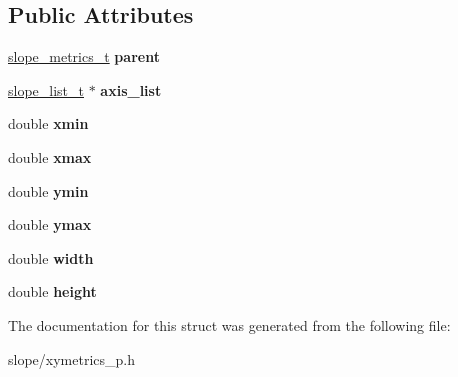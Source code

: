 \subsection*{Public Attributes}
\begin{DoxyCompactItemize}
\item 
\hypertarget{struct__slope__xymetrics_aec0f7546c89f84b770fe7967602f8b5f}{\hyperlink{group__Metrics_gab80787ee8ae8dc449e770249fe0e3c35}{slope\+\_\+metrics\+\_\+t} {\bfseries parent}}\label{struct__slope__xymetrics_aec0f7546c89f84b770fe7967602f8b5f}

\item 
\hypertarget{struct__slope__xymetrics_a0872d22ecbf7129241bf947cfef15769}{\hyperlink{group__List_ga88326d377deca937191acac6784bff0e}{slope\+\_\+list\+\_\+t} $\ast$ {\bfseries axis\+\_\+list}}\label{struct__slope__xymetrics_a0872d22ecbf7129241bf947cfef15769}

\item 
\hypertarget{struct__slope__xymetrics_ad1d3347be073c3d5e54dcc4fcf8be3f0}{double {\bfseries xmin}}\label{struct__slope__xymetrics_ad1d3347be073c3d5e54dcc4fcf8be3f0}

\item 
\hypertarget{struct__slope__xymetrics_a1b5bc871445b58a36fdbd8fda316da64}{double {\bfseries xmax}}\label{struct__slope__xymetrics_a1b5bc871445b58a36fdbd8fda316da64}

\item 
\hypertarget{struct__slope__xymetrics_a0185807d2c62875950fb1001005ee0b3}{double {\bfseries ymin}}\label{struct__slope__xymetrics_a0185807d2c62875950fb1001005ee0b3}

\item 
\hypertarget{struct__slope__xymetrics_a68d0668dd3b423c8fb44fe943cfaaed6}{double {\bfseries ymax}}\label{struct__slope__xymetrics_a68d0668dd3b423c8fb44fe943cfaaed6}

\item 
\hypertarget{struct__slope__xymetrics_adecdb95c1bc9394ea4332c2182539153}{double {\bfseries width}}\label{struct__slope__xymetrics_adecdb95c1bc9394ea4332c2182539153}

\item 
\hypertarget{struct__slope__xymetrics_a51349b89d2fb960fe1503ac3104d80d0}{double {\bfseries height}}\label{struct__slope__xymetrics_a51349b89d2fb960fe1503ac3104d80d0}

\end{DoxyCompactItemize}


The documentation for this struct was generated from the following file\+:\begin{DoxyCompactItemize}
\item 
slope/xymetrics\+\_\+p.\+h\end{DoxyCompactItemize}
